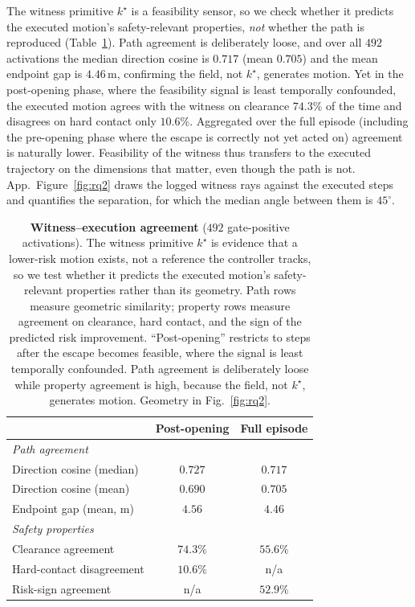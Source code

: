 The witness primitive $k^\star$ is a feasibility sensor, so we check whether it predicts the executed motion's safety-relevant properties, \emph{not} whether the path is reproduced (Table~\ref{tab:witness_validity}). Path agreement is deliberately loose, and over all $492$ activations the median direction cosine is $0.717$ (mean $0.705$) and the mean endpoint gap is $4.46$\,m, confirming the field, not $k^\star$, generates motion. Yet in the post-opening phase, where the feasibility signal is least temporally confounded, the executed motion agrees with the witness on clearance $74.3\%$ of the time and disagrees on hard contact only $10.6\%$. Aggregated over the full episode (including the pre-opening phase where the escape is correctly not yet acted on) agreement is naturally lower. Feasibility of the witness thus transfers to the executed trajectory on the dimensions that matter, even though the path is not. App.~Figure~\ref{fig:rq2} draws the logged witness rays against the executed steps and quantifies the separation, for which the median angle between them is $45^\circ$.

\begin{table}[t]
\centering
\caption{\textbf{Witness--execution agreement} ($492$ gate-positive
activations). The witness primitive $k^\star$ is evidence that a lower-risk
motion exists, not a reference the controller tracks, so we test whether it
predicts the executed motion's safety-relevant properties rather than its
geometry. Path rows measure geometric similarity; property rows measure
agreement on clearance, hard contact, and the sign of the predicted risk
improvement. ``Post-opening'' restricts to steps after the escape becomes
feasible, where the signal is least temporally confounded. Path agreement is
deliberately loose while property agreement is high, because the field, not
$k^\star$, generates motion. Geometry in Fig.~\ref{fig:rq2}.}
\label{tab:witness_validity}
\small
\setlength{\tabcolsep}{6pt}\renewcommand{\arraystretch}{1.1}
\begin{tabular}{lcc}
\toprule
 & Post-opening & Full episode \\
\midrule
\multicolumn{3}{l}{\emph{Path agreement}}\\
Direction cosine (median) & $0.727$ & $0.717$ \\
Direction cosine (mean)   & $0.690$ & $0.705$ \\
Endpoint gap (mean, m)    & $4.56$  & $4.46$  \\
\midrule
\multicolumn{3}{l}{\emph{Safety properties}}\\
Clearance agreement   & $74.3\%$ & $55.6\%$ \\
Hard-contact disagreement & $10.6\%$ & n/a \\
Risk-sign agreement   & n/a & $52.9\%$ \\
\bottomrule
\end{tabular}
\end{table}

